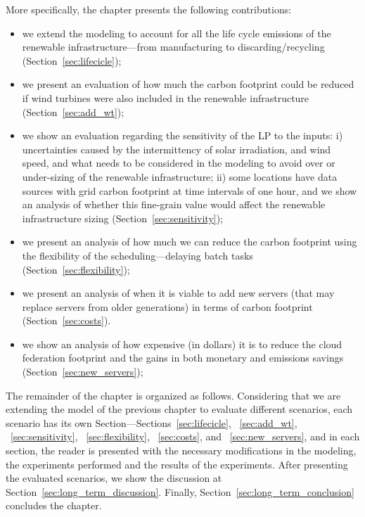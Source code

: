 More specifically, the chapter presents the following contributions:

\begin{itemize}
 
\item we extend the modeling to account for all the life cycle emissions of the renewable infrastructure---from manufacturing to discarding/recycling (Section~\ref{sec:lifecicle});
\item we present an evaluation of how much the carbon footprint could be reduced if wind turbines were also included in the renewable infrastructure   (Section~\ref{sec:add_wt});
\item we show an evaluation regarding the sensitivity of the LP to the inputs: i) uncertainties caused by the intermittency of solar irradiation, and wind speed, and what needs to be considered in the modeling to avoid over or under-sizing of the renewable infrastructure; ii) some locations have data sources with grid carbon footprint at time intervals of one hour, and we show an analysis of whether this fine-grain value would affect the renewable infrastructure sizing  (Section~\ref{sec:sensitivity});
\item we present an analysis of how much we can reduce the carbon footprint using the flexibility of the scheduling---delaying batch tasks (Section~\ref{sec:flexibility});
\item we present an analysis of when it is viable to add new servers (that may replace servers from older generations) in terms of carbon footprint  (Section~\ref{sec:costs}).
\item we show an analysis of how expensive (in dollars) it is to reduce the cloud federation footprint and the gains in both monetary and emissions savings (Section~\ref{sec:new_servers});
  
\end{itemize}


The remainder of the chapter is organized as follows. Considering that we are extending the model of the previous chapter to evaluate different scenarios, each scenario has its own Section---Sections~\ref{sec:lifecicle}, ~\ref{sec:add_wt}, ~\ref{sec:sensitivity}, ~\ref{sec:flexibility}, ~\ref{sec:costs}, and  ~\ref{sec:new_servers}, and in each section, the reader is presented with the necessary modifications in the modeling, the experiments performed and the results of the experiments. After presenting the evaluated scenarios, we show the discussion at Section~\ref{sec:long_term_discussion}. Finally, Section~\ref{sec:long_term_conclusion} concludes the chapter.



